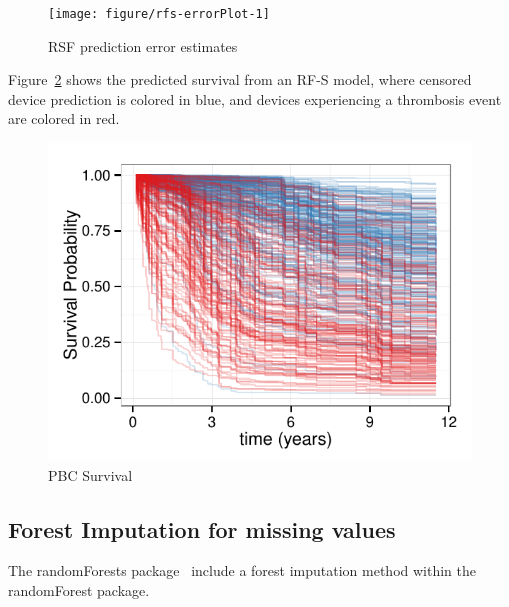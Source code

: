 \documentclass[nojss]{jss}\usepackage[]{graphicx}\usepackage[]{color}
\makeatletter
\def\maxwidth{ %
  \ifdim\Gin@nat@width>\linewidth
    \linewidth
  \else
    \Gin@nat@width
  \fi
}
\makeatother
\begin{document}
\begin{Schunk}
\begin{figure}[!htpb]

{\centering \texttt{[image: figure/rfs-errorPlot-1]} 

}

\caption[RSF prediction error estimates]{RSF prediction error estimates\label{fig:errorPlot}}
\end{figure}
\end{Schunk}

Figure~\ref{fig:rfsrc-plot} shows the predicted survival from an RF-S model, where censored device prediction is colored in blue, and devices experiencing a thrombosis event are colored in red. 
\begin{Schunk}
\begin{figure}[!htpb]

{\centering \includegraphics[width=\maxwidth]{figure/rfs-rfsrc-plot-1} 

}

\caption[PBC Survival]{PBC Survival\label{fig:rfsrc-plot}}
\end{figure}
\end{Schunk}

\subsection{Forest Imputation for missing values}\label{S:imputation}

The randomForests package~\citep{liaw:2002} include a forest imputation method within the randomForest package. 
\end{document}

